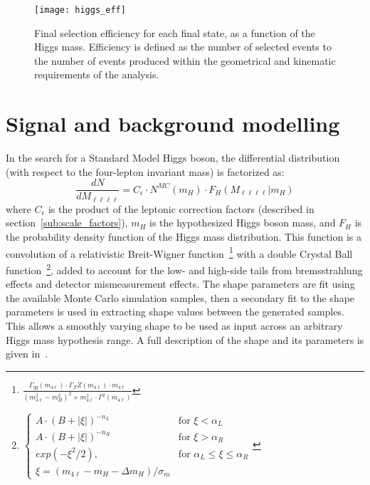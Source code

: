 \begin{figure}[h]
\centering
\texttt{[image: higgs\_eff]}
\caption[Final selection efficiency, as a function of Higgs mass.]{Final selection efficiency for each final
state, as a function of the Higgs mass. Efficiency is defined as the number of
selected events to the number of events produced within the geometrical and
kinematic requirements of the analysis.}
\label{fig:selEff}
\end{figure}



\section{Signal and background modelling}

In the search for a Standard Model Higgs boson, the differential distribution
(with respect to the four-lepton invariant mass) is factorized as:
\begin{equation}
    \label{eqn:higgsShape}
    \frac{dN}{dM_{\ell\ell\ell\ell}} = C_{\epsilon} \cdot N^{MC}(m_H)
    \cdot F_H(M_{\ell\ell\ell\ell} | m_H)
\end{equation}
where $C_\epsilon$ is the product of the leptonic correction factors (described
in section~\ref{sub:scale_factors}), $m_H$ is the hypothesized Higgs boson mass,
and $F_H$ is the probability density function of the Higgs mass distribution.
This function is a convolution of a relativistic Breit-Wigner
function~\footnote{$\frac{\Gamma_{gg}(m_{4\ell})\cdot\Gamma_ZZ(m_{4\ell})\cdot m_{4\ell}}
{(m_{4\ell}^2-m_{H}^2)^2+m_{4\ell}^2\cdot\Gamma^2(m_{4\ell})}$} with a
double Crystal Ball function~\footnote{$\begin{cases} 
A \cdot (B+|\xi|)^{-n_L} &\text{for } \xi < \alpha_L \\ 
A \cdot (B+|\xi|)^{-n_R} &\text{for } \xi > \alpha_R \\ 
exp(-\xi^2/2), & \text{for } \alpha_L \le \xi \le \alpha_R  \\
\xi = (m_{4\ell} - m_{H} - \Delta m_{H} )/ \sigma_m
\end{cases}$}, added to account for the low- and high-side tails
from bremsstrahlung effects and detector mismeasurement effects.
The shape parameters are fit using the available Monte Carlo simulation samples,
then a secondary fit to the shape parameters is used in extracting shape values
between the generated samples. This allows a smoothly varying shape to be used
as input across an arbitrary Higgs mass hypothesis range.
A full description of the shape and its parameters is given
in~\cite{higgsSigShape}.

